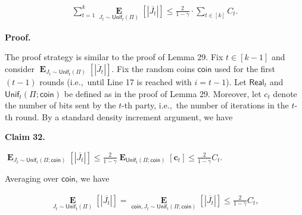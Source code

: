 \[\begin{gathered}
\sum_{t=1}^{k}\operatorname*{\mathbf{E}}_{J_{t}\sim\mathsf{Unif}_{t}(\Pi)}\left[|\overline{J_{t}}|\right]\leq\frac{2}{1-\gamma}\cdot\sum_{t\in[k]}C_{t}.
\end{gathered}\]






\par\medskip\noindent\textbf{Proof.}\par




The proof strategy is similar to the proof of Lemma 29.
Fix $t\in[k-1]$ and consider $\operatorname*{\mathbf{E}}_{J_{t}\sim\mathsf{Unif_{t}}(\Pi)}\left[|\overline{J}_{t}|\right]$.
Fix the random coins $\mathsf{coin}$ used for the first $(t-1)$ rounds (i.e., until Line 17 is reached with $i=t-1$). Let $\mathsf{Real}_{t}$ and $\mathsf{Unif}_{t}(\Pi;\mathsf{coin})$ be defined as in the proof of Lemma 29.
Moreover, let $c_{t}$ denote the number of bits sent by the $t$-th party, i.e., the number of iterations in the $t$-th round.
By a standard density increment argument, we have\par





\par\medskip\noindent\textbf{
Claim 32. 
}\par



$\operatorname*{\mathbf{E}}_{J_{t}\sim\mathsf{Unif}_{t}(\Pi;\mathsf{coin})}\left[|\overline{J_{t}}|\right]\leq\frac{2}{1-\gamma}\operatorname*{\mathbf{E}}_{\mathsf{Unif}_{t}(\Pi;\mathsf{coin})}\left[\bm{c}_{t}\right]\leq\frac{2}{1-\gamma}C_{t}$.\par






Averaging over $\mathsf{coin}$, we have\par


\[\begin{gathered}
\operatorname*{\mathbf{E}}_{J_{t}\sim\mathsf{Unif_{t}}(\Pi)}\left[|\overline{J_{t}}|\right]=\operatorname*{\mathbf{E}}_{\mathsf{coin},J_{t}\sim\mathsf{Unif}_{t}(\Pi;\mathsf{coin})}\left[|\overline{J_{t}}|\right]\leq\frac{2}{1-\gamma}C_{t},
\end{gathered}\]


